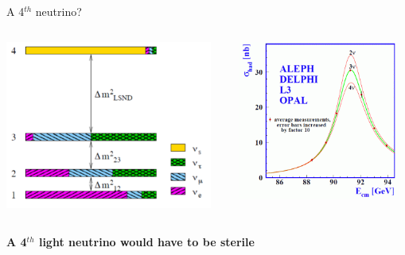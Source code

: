 \begin{frame}[t]{A 4$^{th}$ neutrino?}

\begin{columns}[t]
  \begin{column}{0.50\textwidth}
    \includegraphics[width=0.95\textwidth]{./images/beyond3nu/etc/3p1.png}
  \end{column}
  \begin{column}{0.50\textwidth}
    \includegraphics[width=0.95\textwidth]{./images/beyond3nu/etc/zwidth.png}
  \end{column}
\end{columns}
\begin{center}
 {\bf \color{red} A 4$^{th}$ light neutrino would have to be sterile}
\end{center}
\end{frame}

